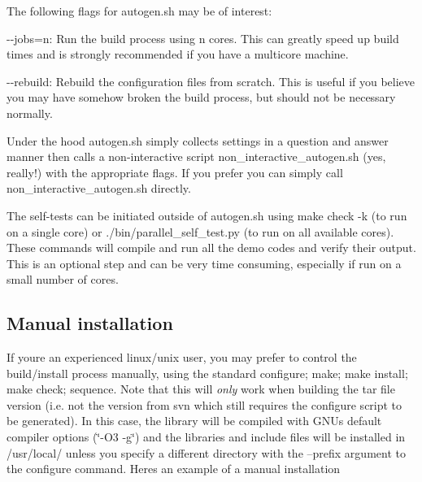 The following flags for {\ttfamily autogen.\+sh} may be of interest\+:


\begin{DoxyItemize}
\item {\ttfamily -\/-\/jobs=n}\+: Run the build process using {\ttfamily n} cores. This can greatly speed up build times and is strongly recommended if you have a multicore machine.
\item {\ttfamily -\/-\/rebuild}\+: Rebuild the configuration files from scratch. This is useful if you believe you may have somehow broken the build process, but should not be necessary normally.
\end{DoxyItemize}

Under the hood {\ttfamily autogen.\+sh} simply collects settings in a question and answer manner then calls a non-\/interactive script {\ttfamily non\+\_\+interactive\+\_\+autogen.\+sh} (yes, really!) with the appropriate flags. If you prefer you can simply call {\ttfamily non\+\_\+interactive\+\_\+autogen.\+sh} directly.

The self-\/tests can be initiated outside of {\ttfamily autogen.\+sh} using {\ttfamily make check -\/k} (to run on a single core) or {\ttfamily ./bin/parallel\+\_\+self\+\_\+test.py} (to run on all available cores). These commands will compile and run all the demo codes and verify their output. This is an optional step and can be very time consuming, especially if run on a small number of cores.\hypertarget{index_manual_install}{}\subsection{Manual installation}\label{index_manual_install}
If you\textquotesingle{}re an experienced linux/unix user, you may prefer to control the build/install process manually, using the standard {\ttfamily configure}; {\ttfamily make}; {\ttfamily make} {\ttfamily install}; {\ttfamily make} {\ttfamily check}; sequence. Note that this will {\itshape only} work when building the tar file version (i.\+e. not the version from svn which still requires the configure script to be generated). In this case, the library will be compiled with G\+NU\textquotesingle{}s default compiler options (\char`\"{}-\/\+O3 -\/g\char`\"{}) and the libraries and include files will be installed in {\ttfamily /usr/local/} unless you specify a different directory with the {\ttfamily --prefix} argument to the {\ttfamily configure} command. Here\textquotesingle{}s an example of a manual installation


